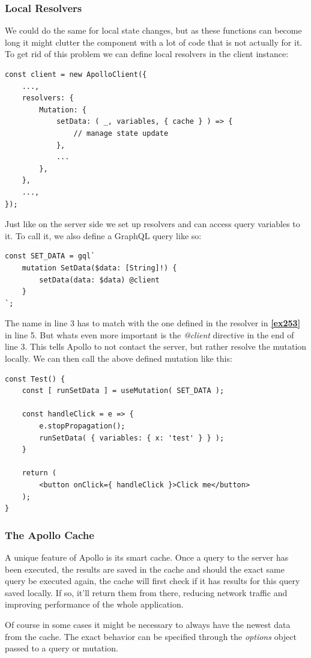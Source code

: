 \subsubsection{Local Resolvers}
We could do the same for local state changes, but as these functions can become long it might clutter the component with a lot of code that is not actually for it. To get rid of this problem we can define local resolvers in the client instance:
\begin{lstlisting}[caption={Local Resolvers},label={ex253}]
const client = new ApolloClient({
	...,
	resolvers: {
		Mutation: {
			setData: ( _, variables, { cache } ) => {
				// manage state update			
			},
			...		
		},	
	},
	...,
});
\end{lstlisting}

Just like on the server side we set up resolvers and can access query variables to it. To call it, we also define a GraphQL query like so:
\begin{lstlisting}
const SET_DATA = gql`
	mutation SetData($data: [String]!) {
		setData(data: $data) @client	
	}
`;
\end{lstlisting}
The name in line 3 has to match with the one defined in the resolver in \textbf{\ref{ex253}} in line 5. But whats even more important is the \emph{@client} directive in the end of line 3. This tells Apollo to not contact the server, but rather resolve the mutation locally. We can then call the above defined mutation like this:
\begin{lstlisting}
const Test() {
	const [ runSetData ] = useMutation( SET_DATA );
	
	const handleClick = e => {
		e.stopPropagation();
		runSetData(	{ variables: { x: 'test' } } );
	}
	
	return (
		<button onClick={ handleClick }>Click me</button>
	);
}
\end{lstlisting}

\subsubsection{The Apollo Cache}
A unique feature of Apollo is its smart cache. Once a query to the server has been executed, the results are saved in the cache and should the exact same query be executed again, the cache will first check if it has results for this query saved locally. If so, it'll return them from there, reducing network traffic and improving performance of the whole application. 

Of course in some cases it might be necessary to always have the newest data from the cache. The exact behavior can be specified through the \emph{options} object passed to a query or mutation.
\\

